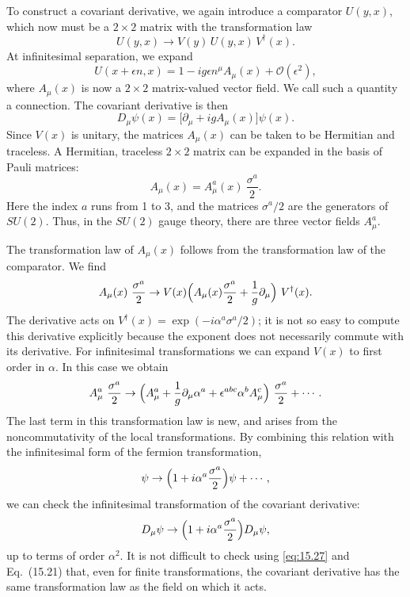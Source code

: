 To construct a covariant derivative, we again introduce a comparator
$U(y,x)$, which now must be a $2\times2$ matrix with the transformation law
\begin{equation}
  U(y,x) \to V(y)\,U(y,x)\,V^{\dagger}(x) .
  \label{eq:15.22}
\end{equation}
At infinitesimal separation, we expand
\begin{equation}
  U(x+\epsilon n, x) = 1 - ig\epsilon n^\mu A_\mu(x) + \mathcal{O}(\epsilon^2),
  \label{eq:15.23}
\end{equation}
where $A_\mu(x)$ is now a $2\times2$ matrix-valued vector field.  We call such
a quantity a connection.  The covariant derivative is then
\begin{equation}
  D_\mu\psi(x) = \bigl[ \partial_\mu + igA_\mu(x) \bigr]\psi(x) .
  \label{eq:15.24}
\end{equation}
Since $V(x)$ is unitary, the matrices $A_\mu(x)$ can be taken to be Hermitian
and traceless.  A Hermitian, traceless $2\times2$ matrix can be expanded in
the basis of Pauli matrices:
\begin{equation}
  A_\mu(x) = A_\mu^a(x)\ \frac{\sigma^a}{2} .
  \label{eq:15.25}
\end{equation}
Here the index $a$ runs from 1 to 3, and the matrices $\sigma^a/2$ are the
generators of $SU(2)$.  Thus, in the $SU(2)$ gauge theory, there are three
vector fields $A_\mu^a$.

The transformation law of $A_\mu(x)$ follows from the transformation law of
the comparator.  We find
\begin{equation}
  A_\mu(x)\ \frac{\sigma^a}{2} \to V(x)\Bigl( A_\mu(x)\frac{\sigma^a}{2}
    + \frac{1}{g}\partial_\mu \Bigr)\ V^{\dagger}(x) .
  \label{eq:15.27}
\end{equation}
The derivative acts on $V^{\dagger}(x) = \exp(-i\alpha^a\sigma^a/2)$; it is not
so easy to compute this derivative explicitly because the exponent does not
necessarily commute with its derivative.  For infinitesimal transformations
we can expand $V(x)$ to first order in $\alpha$.  In this case we obtain
\begin{equation}
  A_\mu^a\ \frac{\sigma^a}{2} \to \Bigl( A_\mu^a + \frac{1}{g}\partial_\mu\alpha^a
    + \epsilon^{abc}\alpha^b A_\mu^c \Bigr)\ \frac{\sigma^a}{2} + \cdots .
  \label{eq:15.28}
\end{equation}
The last term in this transformation law is new, and arises from the
noncommutativity of the local transformations.  By combining this relation
with the infinitesimal form of the fermion transformation,
\begin{equation}
  \psi \to \Bigl( 1 + i\alpha^a\frac{\sigma^a}{2} \Bigr)\psi + \cdots ,
  \label{eq:15.29}
\end{equation}
we can check the infinitesimal transformation of the covariant derivative:
\begin{equation}
  D_\mu\psi \to \Bigl( 1 + i\alpha^a\frac{\sigma^a}{2} \Bigr)D_\mu\psi ,
  \label{eq:15.30}
\end{equation}
up to terms of order $\alpha^2$.  It is not difficult to check using
\eqref{eq:15.27} and Eq.~(15.21) that, even for finite transformations,
the covariant derivative has the same transformation law as the field on
which it acts.

